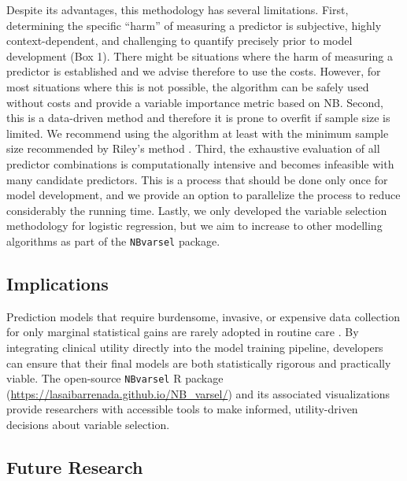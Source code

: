 Despite its advantages, this methodology has several limitations. First, determining the specific \enquote{harm} of measuring a predictor is subjective, highly context-dependent, and challenging to quantify precisely prior to model development (Box 1). There might be situations where the harm of measuring a predictor is established and we advise therefore to use the costs. However, for most situations where this is not possible, the algorithm can be safely used without costs and provide a variable importance metric based on \gls{NB}. Second, this is a data-driven method and therefore it is prone to overfit if sample size is limited. We recommend using the algorithm at least with the minimum sample size recommended by Riley's method \cite{rileyMinimumSampleSize2021}. Third, the exhaustive evaluation of all predictor combinations is computationally intensive and becomes infeasible with many candidate predictors. This is a process that should be done only once for model development, and we provide an option to parallelize the process to reduce considerably the running time. Lastly, we only developed the variable selection methodology for logistic regression, but we aim to increase to other modelling algorithms as part of the \texttt{NBvarsel} package.

\subsection{Implications}

Prediction models that require burdensome, invasive, or expensive data collection for only marginal statistical gains are rarely adopted in routine care \cite{wyattCommentaryPrognosticModels1995}. By integrating clinical utility directly into the model training pipeline, developers can ensure that their final models are both statistically rigorous and practically viable. The open-source \texttt{NBvarsel} R package (\url{https://lasaibarrenada.github.io/NB_varsel/}) and its associated visualizations provide researchers with accessible tools to make informed, utility-driven decisions about variable selection.

\subsection{Future Research}

